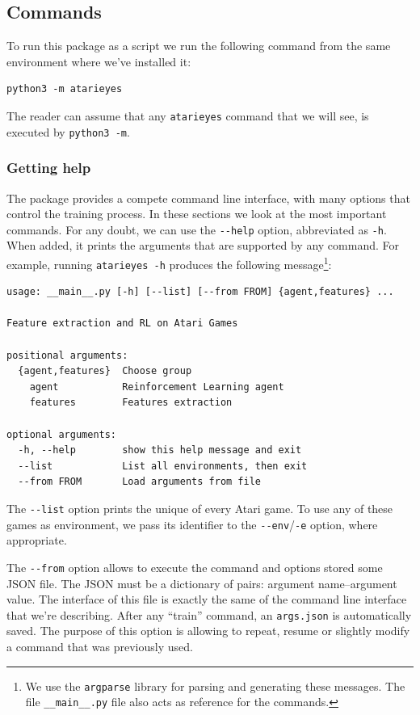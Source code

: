 \subsection{Commands}

To run this package as a script we run the following command from the same
environment where we've installed it:
\begin{lstlisting}[style=bash]
python3 -m atarieyes
\end{lstlisting}
The reader can assume that any \texttt{atarieyes} command that we will see, is
executed by \lstinline[style=inlinesh]|python3 -m|.

\subsubsection*{Getting help}

The package provides a compete command line interface, with many options that
control the training process. In these sections we look at the most important
commands. For any doubt, we can use the \verb|--help| option, abbreviated
as \verb|-h|. When added, it prints the arguments that are supported by any
command. For example, running \lstinline[style=inlinesh]{atarieyes -h}
produces the following message\footnote{We use the
\texttt{argparse} library for parsing and generating these messages. The file
\texttt{\_\_main\_\_.py} file also acts as reference for the commands.}:
\begin{lstlisting}
usage: __main__.py [-h] [--list] [--from FROM] {agent,features} ...

Feature extraction and RL on Atari Games

positional arguments:
  {agent,features}  Choose group
    agent           Reinforcement Learning agent
    features        Features extraction

optional arguments:
  -h, --help        show this help message and exit
  --list            List all environments, then exit
  --from FROM       Load arguments from file
\end{lstlisting}

The \verb|--list| option prints the unique of every Atari game. To use any of
these games as environment, we pass its identifier to the
\verb|--env|/\texttt{-e} option, where appropriate.

The \verb|--from| option allows to execute the command and options stored some
JSON file. The JSON must be a dictionary of pairs: argument name--argument
value. The interface of this file is exactly the same of the command line
interface that we're describing. After any ``train'' command, an
\verb|args.json| is automatically saved. The purpose of this option is
allowing to repeat, resume or slightly modify a command that was previously
used.

